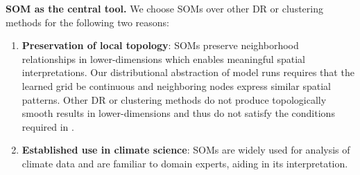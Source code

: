 \vspace{3pt}
\noindent\textbf{SOM as the central tool.} 
We choose SOMs over other DR or clustering methods for the following two reasons:
\begin{enumerate}[noitemsep, topsep=0pt]
\item \textbf{Preservation of local topology}: SOMs preserve neighborhood relationships in lower-dimensions which enables meaningful spatial interpretations. Our distributional abstraction of model runs requires that the learned grid be continuous and neighboring nodes express similar spatial patterns. Other DR or clustering methods do not produce topologically smooth results in lower-dimensions and thus do not satisfy the conditions required in \ClimateSOM.
\item \textbf{Established use in climate science}: SOMs are widely used for analysis of climate data and are familiar to domain experts, aiding in its interpretation.
\end{enumerate}

%
%
%
%

